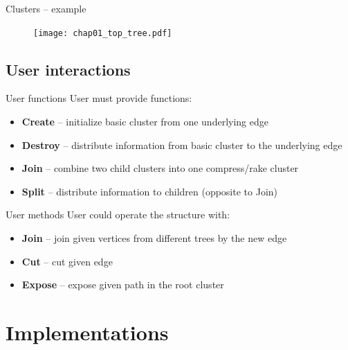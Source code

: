 \documentclass{beamer}				%
\newcommand*{\mysectionpage}{\usebeamertemplate*{my section page}}
\begin{document}
\begin{frame}{Clusters -- example}
	\begin{figure}[h]
	\centering
	\texttt{[image: chap01\_top\_tree.pdf]}
	\end{figure}
\end{frame}

\subsection{User interactions}
\begin{frame}{User functions}
User must provide functions:
\begin{itemize}
\item {\bf Create} -- initialize basic cluster from one underlying edge
\item {\bf Destroy} -- distribute information from basic cluster to the underlying edge
\item {\bf Join} -- combine two child clusters into one compress/rake cluster
\item {\bf Split} -- distribute information to children (opposite to Join)
\end{itemize}
\end{frame}

\begin{frame}{User methods}
User could operate the structure with:
\begin{itemize}
\item {\bf Join} -- join given vertices from different trees by the new edge
\item {\bf Cut} -- cut given edge
\item {\bf Expose} -- expose given path in the root cluster
\end{itemize}
\end{frame}


\section{Implementations}
\begin{frame}
\mysectionpage
\end{frame}
\end{document}
